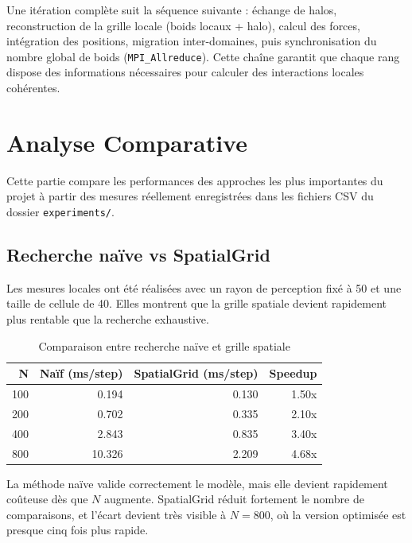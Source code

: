 \documentclass[conference]{IEEEtran}
\begin{document}
Une itération complète suit la séquence suivante : échange de halos, reconstruction de la grille locale (boids locaux + halo), calcul des forces, intégration des positions, migration inter-domaines, puis synchronisation du nombre global de boids (\texttt{MPI\_Allreduce}). Cette chaîne garantit que chaque rang dispose des informations nécessaires pour calculer des interactions locales cohérentes.


\section{Analyse Comparative}
Cette partie compare les performances des approches les plus importantes du projet à partir des mesures réellement enregistrées dans les fichiers CSV du dossier \texttt{experiments/}.

\subsection{Recherche naïve vs SpatialGrid}
Les mesures locales ont été réalisées avec un rayon de perception fixé à 50 et une taille de cellule de 40. Elles montrent que la grille spatiale devient rapidement plus rentable que la recherche exhaustive.

\begin{table}[h]
	\centering
	\caption{Comparaison entre recherche naïve et grille spatiale}
	\begin{tabular}{|r|r|r|r|}
		\hline
		\textbf{N} & \textbf{Naïf (ms/step)} & \textbf{SpatialGrid (ms/step)} & \textbf{Speedup} \\
		\hline
		100        & 0.194                   & 0.130                          & 1.50x            \\
		200        & 0.702                   & 0.335                          & 2.10x            \\
		400        & 2.843                   & 0.835                          & 3.40x            \\
		800        & 10.326                  & 2.209                          & 4.68x            \\
		\hline
	\end{tabular}
	\label{tab:perf_naif_grid}
\end{table}

La méthode naïve valide correctement le modèle, mais elle devient rapidement coûteuse dès que $N$ augmente. SpatialGrid réduit fortement le nombre de comparaisons, et l'écart devient très visible à $N=800$, où la version optimisée est presque cinq fois plus rapide.
\end{document}
